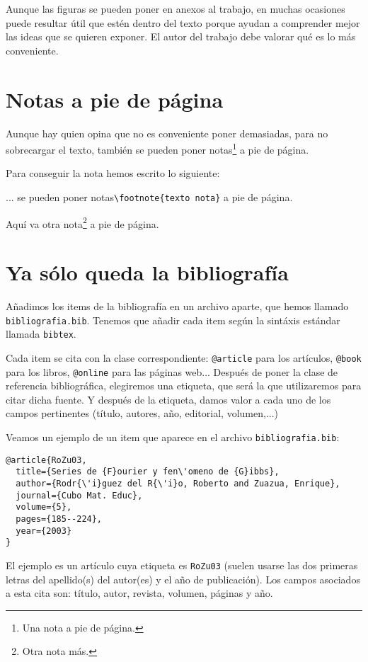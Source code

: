 \documentclass[a4paper,12pt]{article}
\begin{document}
{Aunque las figuras se pueden poner en anexos al trabajo, en muchas ocasiones puede resultar útil que estén dentro del texto porque ayudan a comprender mejor las ideas que se quieren exponer. El autor del trabajo debe valorar qué es lo más conveniente.

\section{Notas a pie de página}

Aunque hay quien opina que no es conveniente poner demasiadas, para no sobrecargar el texto, también se pueden poner notas\footnote{Una nota a pie de página.} a pie de página. 

Para conseguir la nota hemos escrito lo siguiente: 

... se pueden poner notas\verb|\footnote{texto nota}| a pie de página.

Aquí va otra nota\footnote{Otra nota más.} a pie de página.

\section{Ya sólo queda la bibliografía}

Añadimos los items de la bibliografía en un archivo aparte, que hemos llamado \verb|bibliografia.bib|. 
Tenemos que añadir cada item según la sintáxis estándar llamada \verb|bibtex|.

Cada item se cita con la clase correspondiente: \verb|@article| para los artículos, \verb|@book| para los libros, \verb|@online| para las páginas web... 
Después de poner la clase de referencia bibliográfica, elegiremos una etiqueta, que será la que utilizaremos para citar dicha fuente.
Y después de la etiqueta, damos valor a cada uno de los campos pertinentes (título, autores, año, editorial, volumen,...)

Veamos un ejemplo de un item que aparece en el archivo \verb|bibliografia.bib|:

\begin{verbatim}@article{RoZu03,
  title={Series de {F}ourier y fen\'omeno de {G}ibbs},
  author={Rodr{\'i}guez del R{\'i}o, Roberto and Zuazua, Enrique},
  journal={Cubo Mat. Educ},
  volume={5},
  pages={185--224},
  year={2003}
}
\end{verbatim}

El ejemplo es un artículo cuya etiqueta es \verb|RoZu03| (suelen usarse las dos primeras letras del apellido(s) del autor(es) y el año de publicación). Los campos asociados a esta cita son: título, autor, revista, volumen, páginas y año.

}
\end{document}
